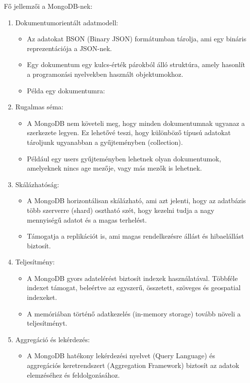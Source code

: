 \documentclass{thesis-ekf}
\theoremstyle{definition}
\theoremstyle{remark}
\begin{document}
	Fő jellemzői a MongoDB-nek:
	\begin{enumerate}
		\item Dokumentumorientált adatmodell:
		\begin{itemize}
			\item Az adatokat BSON (Binary JSON) formátumban tárolja, ami egy bináris reprezentációja a JSON-nek.
			\item Egy dokumentum egy kulcs-érték párokból álló struktúra, amely hasonlít a programozási nyelvekben használt objektumokhoz.
			\item Példa egy dokumentumra:
		\end{itemize}
		\item Rugalmas séma:
		\begin{itemize}
			\item A MongoDB nem követeli meg, hogy minden dokumentumnak ugyanaz a szerkezete legyen. Ez lehetővé teszi, hogy különböző típusú adatokat tároljunk ugyanabban a gyűjteményben (collection).
			\item Például egy users gyűjteményben lehetnek olyan dokumentumok, amelyeknek nincs age mezője, vagy más mezők is lehetnek.
		\end{itemize}
		\item Skálázhatóság:
		\begin{itemize}
			\item A MongoDB horizontálisan skálázható, ami azt jelenti, hogy az adatbázis több szerverre (shard) osztható szét, hogy kezelni tudja a nagy mennyiségű adatot és a magas terhelést.
			\item Támogatja a replikációt is, ami magas rendelkezésre állást és hibaelállást biztosít.
		\end{itemize}
		\item Teljesítmény:
		\begin{itemize}
			\item A MongoDB gyors adatelérést biztosít indexek használatával. Többféle indexet támogat, beleértve az egyszerű, összetett, szöveges és geospatial indexeket.
			\item A memóriában történő adatkezelés (in-memory storage) tovább növeli a teljesítményt.
		\end{itemize}
		\item Aggregáció és lekérdezés:
		\begin{itemize}
			\item A MongoDB hatékony lekérdezési nyelvet (Query Language) és aggregációs keretrendszert (Aggregation Framework) biztosít az adatok elemzéséhez és feldolgozásához.
		\end{itemize}
	\end{enumerate}
\end{document}
